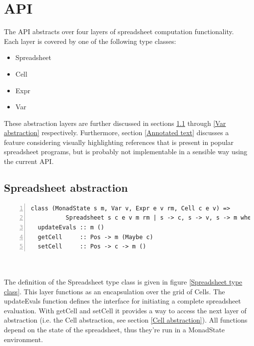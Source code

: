 \documentclass[10pt,a4paper]{article}
\begin{document}
\section{API}
\label{API}
The API abstracts over four layers of spreadsheet computation functionality.
Each layer is covered by one of the following type classes:
\begin{itemize}
\item Spreadsheet
\item Cell
\item Expr
\item Var
\end{itemize}
These abstraction layers are further discussed in sections \ref{Spreadsheet abstraction} through
\ref{Var abstraction} respectively. Furthermore, section \ref{Annotated text} discusses a feature
considering visually highlighting references that is present in popular spreadsheet programs,
but is probably not implementable in a sensible way using the current API.

\subsection{Spreadsheet abstraction}
\label{Spreadsheet abstraction}
\begin{minipage}{\linewidth}
\begin{Verbatim}[numbers=left,stepnumber=1,numbersep=5pt]
class (MonadState s m, Var v, Expr e v rm, Cell c e v) =>
          Spreadsheet s c e v m rm | s -> c, s -> v, s -> m where
  updateEvals :: m ()
  getCell     :: Pos -> m (Maybe c)
  setCell     :: Pos -> c -> m ()
\end{Verbatim}
\label{Spreadsheet type class}
\end{minipage}
\\\\
The definition of the Spreadsheet type class is given in figure \ref{Spreadsheet type class}.
This layer functions as an encapsulation over the grid of Cells. The updateEvals function
defines the interface for initiating a complete spreadsheet evaluation.
With getCell and setCell it provides a way to access the next layer of abstraction (i.e. the
Cell abstraction, see section \ref{Cell abstraction}). All functions depend on the state of the
spreadsheet, thus they're run in a MonadState environment.
\end{document}
